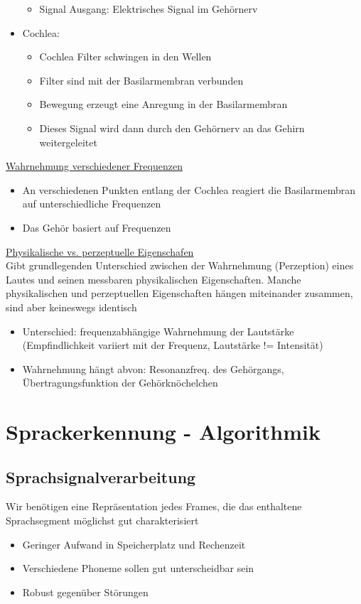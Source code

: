 \documentclass[a4paper,10pt,oneside]{article}
\begin{document}
\begin{itemize}
\begin{itemize}
				\item Signal Ausgang: Elektrisches Signal im Gehörnerv
			\end{itemize}
		\item Cochlea:
			\begin{itemize}
				\item Cochlea Filter schwingen in den Wellen
				\item Filter sind mit der Basilarmembran verbunden
				\item Bewegung erzeugt eine Anregung in der Basilarmembran
				\item Dieses Signal wird dann durch den Gehörnerv an das Gehirn weitergeleitet
			\end{itemize}
	\end{itemize}

\underline{Wahrnehmung verschiedener Frequenzen} \\
	\begin{itemize}
		\item An verschiedenen Punkten entlang der Cochlea reagiert die Basilarmembran auf unterschiedliche Frequenzen
		\item Das Gehör basiert auf Frequenzen
	\end{itemize}

\underline{Physikalische vs. perzeptuelle Eigenschafen} \\
Gibt grundlegenden Unterschied zwischen der Wahrnehmung (Perzeption) eines Lautes und seinen messbaren physikalischen Eigenschaften. Manche physikalischen und perzeptuellen Eigenschaften hängen miteinander zusammen, sind aber keineswegs identisch
	\begin{itemize}
		\item Unterschied: frequenzabhängige Wahrnehmung der Lautstärke (Empfindlichkeit variiert mit der Frequenz, Lautstärke != Intensität)
		\item Wahrnehmung hängt abvon: Resonanzfreq. des Gehörgangs, Übertragungsfunktion der Gehörknöchelchen
	\end{itemize}
	
\section{Sprackerkennung - Algorithmik}
\subsection{Sprachsignalverarbeitung}
Wir benötigen eine Repräsentation jedes Frames, die das enthaltene Sprachsegment möglichst gut charakterisiert
	\begin{itemize}
		\item Geringer Aufwand in Speicherplatz und Rechenzeit
		\item Verschiedene Phoneme sollen gut unterscheidbar sein
		\item Robust gegenüber Störungen 
	\end{itemize}
\end{document}
